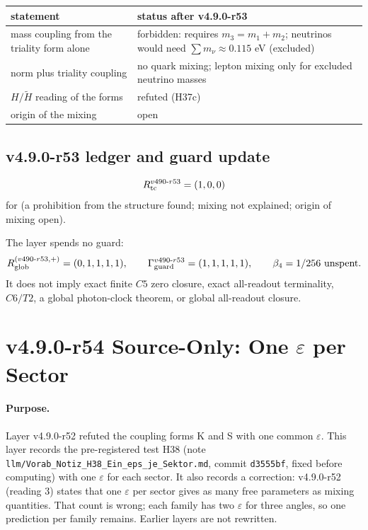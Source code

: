 \begin{center}
\small
\begin{tabular}{@{}>{\raggedright\arraybackslash}p{}>{\raggedright\arraybackslash}p{}@{}}
\toprule
statement & status after v4.9.0-r53\\
\midrule
mass coupling from the triality form alone & forbidden: requires \(m_3=m_1+m_2\); neutrinos would need \(\sum m_\nu\approx0.115\) eV (excluded)\\
norm plus triality coupling & no quark mixing; lepton mixing only for excluded neutrino masses\\
\(H/\tilde H\) reading of the forms & refuted (H37c)\\
origin of the mixing & open\\
\bottomrule
\end{tabular}
\end{center}

\subsection*{v4.9.0-r53 ledger and guard update}
\label{subsec:v490-r53-ledger-guard}

\[
R_{\rm tc}^{v490\text{-}r53}=(1,0,0)
\]
for (a prohibition from the structure found; mixing not explained; origin of mixing open).

The layer spends no guard:
\[
R_{\rm glob}^{(v490\text{-}r53,+)}=(0,1,1,1,1),
\qquad
\Gamma_{\rm guard}^{v490\text{-}r53}=(1,1,1,1,1),
\qquad
\beta_4=1/256\ \text{unspent}.
\]
It does not imply exact finite \(C5\) zero closure, exact all-readout terminality,
\(C6/T2\), a global photon-clock theorem, or global all-readout closure.

\clearpage
\section*{v4.9.0-r54 Source-Only: One \texorpdfstring{\(\varepsilon\)}{epsilon} per Sector}
\label{sec:v490-r54-eps-per-sector}

\paragraph{Purpose.}
Layer v4.9.0-r52 refuted the coupling forms K and S with one common \(\varepsilon\).  This layer records the pre-registered test H38 (note
\texttt{llm/Vorab\_Notiz\_H38\_Ein\_eps\_je\_Sektor.md}, commit \texttt{d3555bf}, fixed before computing) with one \(\varepsilon\) for each sector.
It also records a correction: v4.9.0-r52 (reading 3) states that one \(\varepsilon\) per sector gives as many free parameters as mixing quantities.
That count is wrong; each family has two \(\varepsilon\) for three angles, so one prediction per family remains.  Earlier layers are not rewritten.

